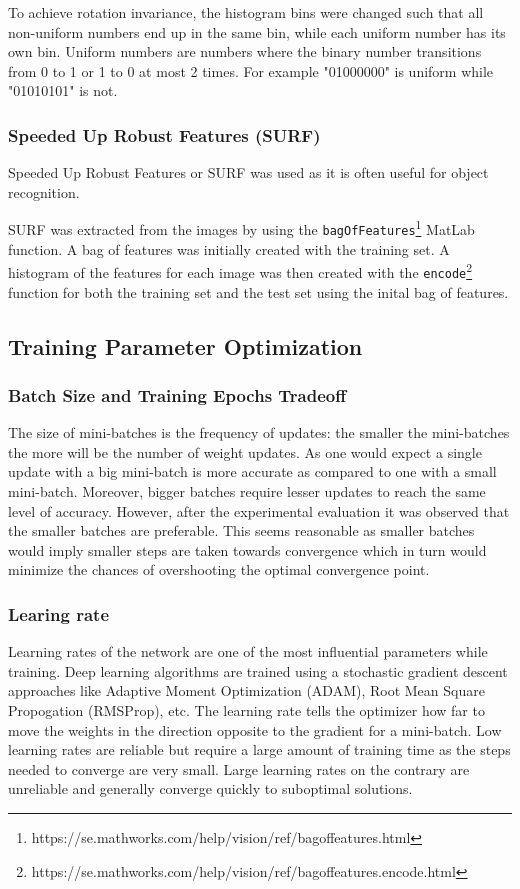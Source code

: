 \documentclass[doc/report.tex]{subfiles}
\begin{document}
To achieve rotation invariance, the histogram bins were changed such that all
non-uniform numbers end up in the same bin, while each uniform number has its
own bin. Uniform numbers are numbers where the binary number transitions from 0
to 1 or 1 to 0 at most 2 times. For example "01000000" is uniform while
"01010101" is not.

\subsubsection{Speeded Up Robust Features (SURF)}
Speeded Up Robust Features or SURF was used as it is often useful for object
recognition.

SURF was extracted from the images by using the
\texttt{bagOfFeatures}\footnote{https://se.mathworks.com/help/vision/ref/bagoffeatures.html}
MatLab function. A bag of features was initially created with the training set.
A histogram of the features for each image was then created with the
\texttt{encode}\footnote{https://se.mathworks.com/help/vision/ref/bagoffeatures.encode.html}
function for both the training set and the test set using the inital bag of
features.


\subsection{Training Parameter Optimization}
\subsubsection{Batch Size and Training Epochs Tradeoff}
The size of mini-batches is the frequency of updates: the smaller the mini-batches the more will be the number of weight updates. As one would expect a single update with a big mini-batch is more accurate as compared to one with a small mini-batch. Moreover, bigger batches require lesser updates to reach the same level of accuracy. However, after the experimental evaluation it was observed that the smaller batches are preferable. This seems reasonable as smaller batches would imply smaller steps are taken towards convergence which in turn would minimize the chances of overshooting the optimal convergence point.

\subsubsection{Learing rate}
Learning rates of the network are one of the most influential parameters while training. Deep learning algorithms are trained using a stochastic gradient descent approaches like Adaptive Moment Optimization (ADAM), Root Mean Square Propogation (RMSProp), etc. The learning rate tells the optimizer how far to move the weights in the direction opposite to the gradient for a mini-batch. Low learning rates are reliable but require a large amount of training time as the steps needed to converge are very small. Large learning rates on the contrary are unreliable and generally converge quickly to suboptimal solutions.
\end{document}
